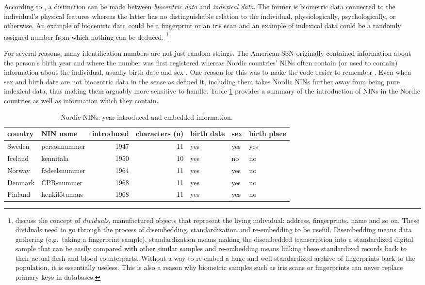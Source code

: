 According to \citet{Alterman2003}, a distinction can be made between \emph{biocentric data} and \emph{indexical data}. The former is biometric data connected to the individual's physical features whereas the latter has no distinguishable relation to the individual, physiologically, psychologically, or otherwise. An example of biocentric data could be a fingerprint or an iris scan and an example of indexical data could be a randomly assigned number from which nothing can be deduced. \footnote{\citet{brensinger2021} discuss the concept of \emph{dividuals}, manufactured objects that represent the living individual: address, fingerprints, name and so on. These dividuals need to go through the process of disembedding, standardization and re-embedding to be useful. Disembedding means data gathering (e.g.~taking a fingerprint sample), standardization means making the disembedded transcription into a standardized digital sample that can be easily compared with other similar samples and re-embedding means linking these standardized records back to their actual flesh-and-blood counterparts. Without a way to re-embed a huge and well-standardized archive of fingerprints back to the population, it is essentially useless. This is also a reason why biometric samples such as iris scans or fingerprints can never replace primary keys in databases.}

For several reasons, many identification numbers are not just random strings. The American SSN originally contained information about the person's birth year and where the number was first registered \citep[p.~32]{brensinger2021} whereas Nordic countries' NINs often contain (or used to contain) information about the individual, usually birth date and sex \citep{watson2010, salste2021}. One reason for this was to make the code easier to remember \citep{alastalo2022}. Even when sex and birth date are not biocentric data in the sense as \citet{Alterman2003} defined it, including them takes Nordic NINs further away from being pure indexical data, thus making them arguably more sensitive to handle. Table \ref{tab:nin-table} provides a summary of the introduction of NINs in the Nordic countries as well as information which they contain.

\begin{table}[!h]
\centering
\caption{\label{tab:nin-table}Nordic NINs: year introduced and embedded information.}
\centering
\begin{tabular}[t]{llrrlll}
\toprule
country & NIN name & introduced & characters (n) & birth date & sex & birth place\\
\midrule
Sweden & personnummer & 1947 & 11 & yes & yes & yes\\
Iceland & kennitala & 1950 & 10 & yes & no & no\\
Norway & fødselsnummer & 1964 & 11 & yes & yes & no\\
Denmark & CPR-nummer & 1968 & 11 & yes & yes & no\\
Finland & henkilötunnus & 1968 & 11 & yes & yes & no\\
\bottomrule
\end{tabular}
\end{table}

